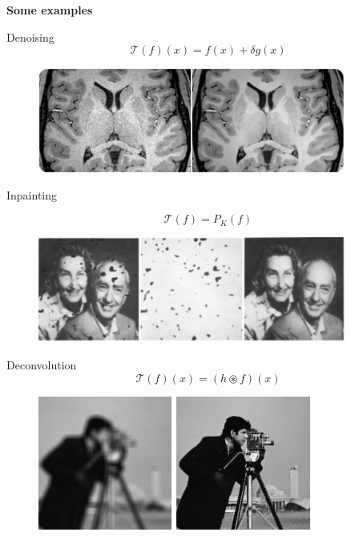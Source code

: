 \begin{frame}{}
  \centering \Large
  \textbf{Some examples}
\end{frame}

\begin{frame}{Denoising}
$$
\mathcal{T}(f)(x) = f(x)+\delta g(x)
$$
\begin{figure}
\centering
\includegraphics[width=0.9\textwidth]{./Images/denoise.jpg}
\end{figure}

\end{frame}

\begin{frame}{Inpainting}

$$
\mathcal{T}(f)  = P_K(f)
$$

\begin{figure}
\centering
\includegraphics[width=0.9\textwidth]{./Images/inpaint.jpg}
\end{figure}

\end{frame}

\begin{frame}{Deconvolution}
$$
\mathcal{T}(f)(x) = (h \circledast f)(x)
$$
\begin{figure}
\centering
\includegraphics[width=0.8\textwidth]{./Images/deblurr.jpg}
\end{figure}

\end{frame}

